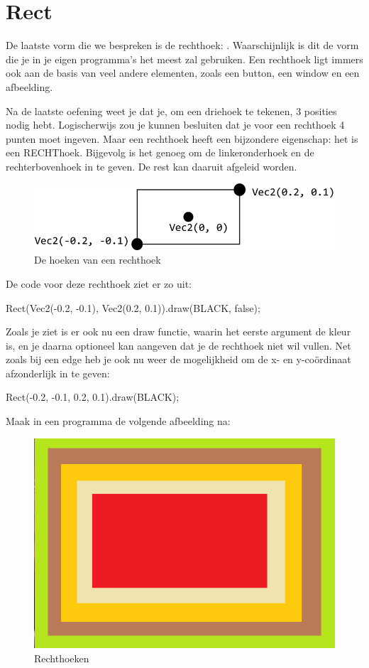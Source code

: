 \section{Rect}
De laatste vorm die we bespreken is de rechthoek: . Waarschijnlijk is dit de vorm die je in je eigen programma's het meest zal gebruiken. Een rechthoek ligt immers ook aan de basis van veel andere elementen, zoals een button, een window en een afbeelding.

Na de laatste oefening weet je dat je, om een driehoek te tekenen, 3 posities nodig hebt. Logischerwijs zou je kunnen besluiten dat je voor een rechthoek 4 punten moet ingeven. Maar een rechthoek heeft een bijzondere eigenschap: het is een RECHThoek. Bijgevolg is het genoeg om de linkeronderhoek en de rechterbovenhoek in te geven. De rest kan daaruit afgeleid worden.

\begin{figure}[h]
\centering
\includegraphics[width=0.8\linewidth]{../images/rectangle.png}
\caption[]{De hoeken van een rechthoek}
\label{fig:rect}
\end{figure}

De code voor deze rechthoek ziet er zo uit:

\begin{code}
Rect(Vec2(-0.2, -0.1), Vec2(0.2, 0.1)).draw(BLACK, false);
\end{code}

Zoals je ziet is er ook nu een draw functie, waarin het eerste argument de kleur is, en je daarna optioneel kan aangeven dat je de rechthoek niet wil vullen. Net zoals bij een edge heb je ook nu weer de mogelijkheid om de x- en y-co\"ordinaat afzonderlijk in te geven:

\begin{code}
Rect(-0.2, -0.1, 0.2, 0.1).draw(BLACK);
\end{code}

\begin{exercise}
\item Maak in een programma de volgende afbeelding na:

\begin{figure}[h]
\centering
\includegraphics[width=0.4\linewidth]{../images/nested_rectangles.png}
\caption[]{Rechthoeken}
\label{fig:nested_rect}
\end{figure}
\end{exercise}

